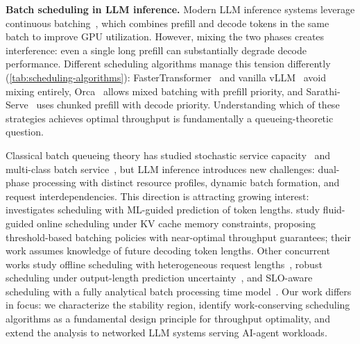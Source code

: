 \documentclass[11pt]{article}
\theoremstyle{plain}
\theoremstyle{definition}
\theoremstyle{remark}
\begin{document}
\textbf{Batch scheduling in LLM inference.} Modern LLM inference systems leverage continuous batching~\citep{yu2022orca}, which combines prefill and decode tokens in the same batch to improve GPU utilization. However, mixing the two phases creates interference: even a single long prefill can substantially degrade decode performance. Different scheduling algorithms manage this tension differently (\cref{tab:scheduling-algorithms}): FasterTransformer~\citep{fastertransformer} and vanilla vLLM~\citep{kwon2023efficient} avoid mixing entirely, Orca~\citep{yu2022orca} allows mixed batching with prefill priority, and Sarathi-Serve~\citep{agrawal2023sarathi} uses chunked prefill with decode priority. Understanding which of these strategies achieves optimal throughput is fundamentally a queueing-theoretic question.

Classical batch queueing theory has studied stochastic service capacity~\citep{chang2005performance,janssen2005analytic} and multi-class batch service~\citep{baetens2018delay,reddy1993scheduling}, but LLM inference introduces new challenges: dual-phase processing with distinct resource profiles, dynamic batch formation, and request interdependencies. This direction is attracting growing interest: \cite{mitzenmacher2025queueing} investigates scheduling with ML-guided prediction of token lengths. \cite{ao2025optimizing} study fluid-guided online scheduling under KV cache memory constraints, proposing threshold-based batching policies with near-optimal throughput guarantees; their work assumes knowledge of future decoding token lengths. Other concurrent works study offline scheduling with heterogeneous request lengths~\citep{wang2025llmserving}, robust scheduling under output-length prediction uncertainty~\citep{chen2025adaptively}, and SLO-aware scheduling with a fully analytical batch processing time model~\citep{bari2025optimal}. Our work differs in focus: we characterize the stability region, identify work-conserving scheduling algorithms as a fundamental design principle for throughput optimality, and extend the analysis to networked LLM systems serving AI-agent workloads.



\end{document}
